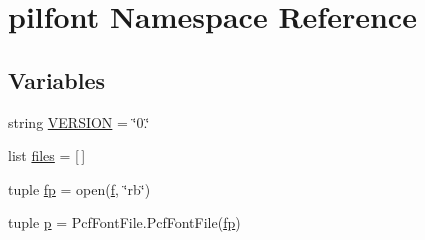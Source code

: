 \hypertarget{namespacepilfont}{\section{pilfont Namespace Reference}
\label{namespacepilfont}
}
\subsection*{Variables}
\begin{DoxyCompactItemize}
\item 
string \hyperlink{namespacepilfont_a9650494ad2d5214e4386c4924a047d37}{V\-E\-R\-S\-I\-O\-N} = \char`\"{}0.\char`\"{}
\item 
list \hyperlink{namespacepilfont_ae3f6feb13e5bfae313c861c3babfa849}{files} = \mbox{[}$\,$\mbox{]}
\item 
tuple \hyperlink{namespacepilfont_a638abcd1a8707a6ba6223cbb9fc8ac3d}{fp} = open(\hyperlink{jquery-migrate-1_82_81_8min_8js_a9cf09a2972472098a4c689fd988f4dfc}{f}, \char`\"{}rb\char`\"{})
\item 
tuple \hyperlink{namespacepilfont_ab4c87fc92a3c3c333c9f41fced31fe09}{p} = Pcf\-Font\-File.\-Pcf\-Font\-File(\hyperlink{namespacepilfont_a638abcd1a8707a6ba6223cbb9fc8ac3d}{fp})
\end{DoxyCompactItemize}



